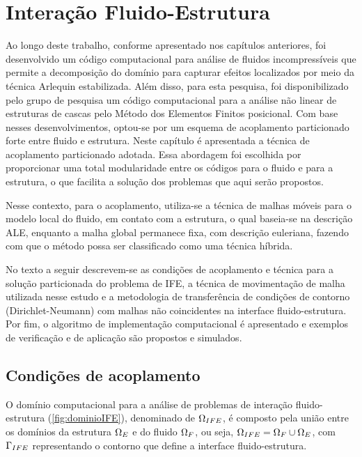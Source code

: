 \chapter[Acoplamento Fluido-Estrutura]{Interação Fluido-Estrutura} \label{capitulo:Cap7}

Ao longo deste trabalho, conforme apresentado nos capítulos anteriores, foi desenvolvido um código computacional para análise de fluidos incompressíveis que permite a decomposição do domínio para capturar efeitos localizados por meio da técnica Arlequin estabilizada. Além disso, para esta pesquisa, foi disponibilizado pelo grupo de pesquisa um código computacional para a análise não linear de estruturas de cascas pelo Método dos Elementos Finitos posicional. Com base nesses desenvolvimentos, optou-se por um esquema de acoplamento particionado forte entre fluido e estrutura. Neste capítulo é apresentada a técnica de acoplamento particionado adotada. Essa abordagem foi escolhida por proporcionar uma total modularidade entre os códigos para o fluido e para a estrutura, o que facilita a solução dos problemas que aqui serão propostos.

Nesse contexto, para o acoplamento, utiliza-se a técnica de malhas móveis para o modelo local do fluido, em contato com a estrutura, o qual baseia-se na descrição ALE, enquanto a malha global permanece fixa, com descrição euleriana, fazendo com que o método possa ser classificado como uma técnica híbrida.

No texto a seguir descrevem-se as condições de acoplamento e técnica para a solução particionada do problema de IFE, a técnica de movimentação de malha utilizada nesse estudo e a metodologia de transferência de condições de contorno (Dirichlet-Neumann) com malhas não coincidentes na interface fluido-estrutura. Por fim, o algoritmo de implementação computacional é apresentado e exemplos de verificação e de aplicação são propostos e simulados.

\section{Condições de acoplamento}

O domínio computacional para a análise de problemas de interação fluido-estrutura (\autoref{fig:dominioIFE}), denominado de $\Omega_{IFE}$, é composto pela união entre os domínios da estrutura $\Omega_{E}$ e do fluido $\Omega_{F}$, ou seja, $\Omega_{IFE} = \Omega_{F} \cup \Omega_{E}$, com $\Gamma_{IFE}$ representando o contorno que define a interface fluido-estrutura.

